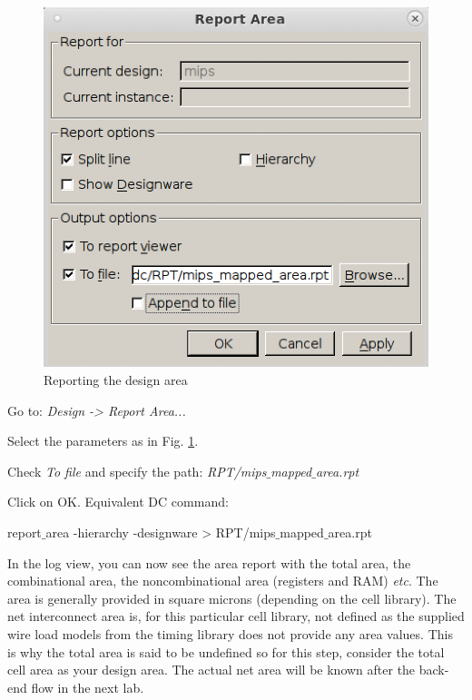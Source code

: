  \begin{enumerate}
	\parbox[t]{\dimexpr\textwidth-\leftmargin}{%
		\begin{figure}
			\vspace{0mm}
			\centering
			\vspace{-\baselineskip}
	\includegraphics[scale=0.4]{figures/lab3_design_compiler/reportarea}
\caption{Reporting the design area}
\label{fig_reportarea}
		\end{figure}
	\item Go to: \textit {Design -> Report Area...}
\item Select the parameters as in Fig. \ref{fig_reportarea}.
\item Check \textit{To file} and specify the path: \textit{RPT/mips$\_$mapped$\_$area.rpt}
\item Click on OK. \newline \newline
Equivalent DC command:

\begin{codeline}
	report$\_$area -hierarchy -designware > RPT/mips$\_$mapped$\_$area.rpt
\end{codeline}
In the log view, you can now see the area report with the total area, the combinational area, the noncombinational area (registers and RAM) \textit{etc}. The area is generally provided in square microns (depending on the cell library). The net interconnect area is, for this particular cell library, not defined as the supplied wire load
models from the timing library does not provide any area values. This is why the total area is said to be undefined so for this step, consider the total cell area as your design area. The actual net area will be known after the back-end flow in the next lab.
	}
\end{enumerate} 
\clearpage


